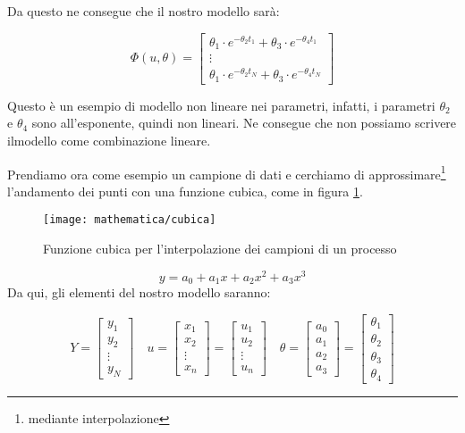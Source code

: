 \begin{esempio}
Da questo ne consegue che il nostro modello sarà:

  \[ \Phi(u,\theta)=\begin{bmatrix} \theta_1 \cdot e^{-\theta_2 t_1} + \theta_3 \cdot e^{-\theta_4 t_1}\\ \vdots  \\ \theta_1 \cdot e^{-\theta_2 t_N} + \theta_3 \cdot e^{-\theta_4 t_N} \end{bmatrix} \]
  
Questo è un esempio di modello non lineare nei parametri, infatti, i parametri $\theta_2$ e $\theta_4$ sono all'esponente, quindi non lineari. Ne consegue che non possiamo scrivere ilmodello come combinazione lineare.
\end{esempio}

\begin{esempio} %
Prendiamo ora come esempio un campione di dati e cerchiamo di approssimare\footnote{mediante interpolazione} l'andamento dei punti con una funzione cubica, come in figura \ref{fig:andamentocubido}.

  \begin{figure}[htbp]
    \centering
    \texttt{[image: mathematica/cubica]}
    \caption{Funzione cubica per l'interpolazione dei campioni di un processo\label{fig:andamentocubido}}
  \end{figure}

  \[ y=a_0 + a_1x+a_2x^2+a_3x^3 \]
Da qui, gli elementi del nostro modello saranno:

  \[
    Y=\begin{bmatrix} y_1\\y_2\\ \vdots \\ y_N \end{bmatrix}\quad
    u=\begin{bmatrix} x_1 \\ x_2 \\ \vdots \\ x_n \end{bmatrix}=\begin{bmatrix} u_1 \\ u_2 \\ \vdots \\u_n \end{bmatrix}\quad
    \theta=\begin{bmatrix} a_0 \\ a_1 \\ a_2 \\ a_3 \end{bmatrix}=\begin{bmatrix} \theta_1 \\ \theta_2 \\ \theta_3 \\ \theta_4 \end{bmatrix}
  \]
  

\end{esempio}
